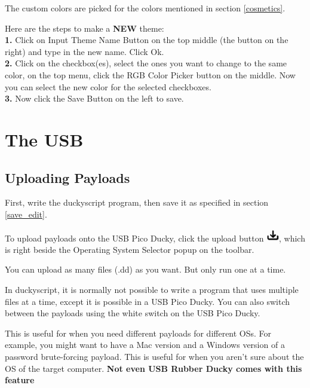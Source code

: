 \documentclass[a4paper,12pt]{article}
\begin{document}
The custom colors are picked for the colors mentioned in section \ref{cosmetics}.

Here are the steps to make a \textbf{NEW} theme:\\
\textbf{1.} Click on \colorbox{WhiteSmoke!70!Lavender}{Input Theme Name} Button on the top middle (the button on the right) and type in the new name. Click \colorbox{WhiteSmoke!70!Lavender}{Ok}.\\
\textbf{2.} Click on the checkbox(es), select the ones you want to change to the same color, on the top menu, click the \colorbox{WhiteSmoke!70!Lavender}{RGB Color Picker} button on the middle. Now you can select the new color for the selected checkboxes.\\
\textbf{3.} Now click the \colorbox{WhiteSmoke!70!Lavender}{Save} Button on the left to save.\\

\section{The USB}

\subsection{Uploading Payloads}\label{upload_payloads}

First, write the duckyscript program, then save it as specified in section \ref{save_edit}.

To upload payloads onto the USB Pico Ducky, click the upload button \includegraphics[width=5.5mm]{pictures/white_bk/upload.png}, which is right beside the Operating System Selector popup on the toolbar.

You can upload as many files (.dd) as you want. But only run one at a time.

In duckyscript, it is normally not possible to write a program that uses multiple files at a time, except it is possible in a USB Pico Ducky. You can also switch between the payloads using the white switch on the USB Pico Ducky.

This is useful for when you need different payloads for different OSs. For example, you might want to have a Mac version and a Windows version of a password brute-forcing payload. This is useful for when you aren't sure about the OS of the target computer. \textbf{Not even USB Rubber Ducky comes with this feature}
\end{document}
